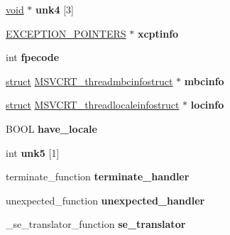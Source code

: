 \begin{DoxyCompactItemize}
\hyperlink{interfacevoid}{void} $\ast$ {\bfseries unk4} \mbox{[}3\mbox{]}
\item 
\mbox{\label{struct____thread__data_aa0656b2e59e51c7a38f3b96a54439ca4}} 
\hyperlink{struct___e_x_c_e_p_t_i_o_n___p_o_i_n_t_e_r_s}{E\+X\+C\+E\+P\+T\+I\+O\+N\+\_\+\+P\+O\+I\+N\+T\+E\+RS} $\ast$ {\bfseries xcptinfo}
\item 
\mbox{\label{struct____thread__data_a8f12bcb3dee8c16a51fb9549999bf540}} 
int {\bfseries fpecode}
\item 
\mbox{\label{struct____thread__data_a13926ec00320dff360cb92ecf3189a43}} 
\hyperlink{interfacestruct}{struct} \hyperlink{struct_m_s_v_c_r_t__threadmbcinfostruct}{M\+S\+V\+C\+R\+T\+\_\+threadmbcinfostruct} $\ast$ {\bfseries mbcinfo}
\item 
\mbox{\label{struct____thread__data_aaf63fd8e188ed1eb3405f21fc8a0e763}} 
\hyperlink{interfacestruct}{struct} \hyperlink{struct_m_s_v_c_r_t__threadlocaleinfostruct}{M\+S\+V\+C\+R\+T\+\_\+threadlocaleinfostruct} $\ast$ {\bfseries locinfo}
\item 
\mbox{\label{struct____thread__data_a459d879c00991ba65884b489a0722058}} 
B\+O\+OL {\bfseries have\+\_\+locale}
\item 
\mbox{\label{struct____thread__data_ae16761f08d8fb64426b1fbd8f80bb248}} 
int {\bfseries unk5} \mbox{[}1\mbox{]}
\item 
\mbox{\label{struct____thread__data_aae21a364527744e7a0c19e32edc2caa6}} 
terminate\+\_\+function {\bfseries terminate\+\_\+handler}
\item 
\mbox{\label{struct____thread__data_ac33056e36d609b80ae99a8a630ebabe7}} 
unexpected\+\_\+function {\bfseries unexpected\+\_\+handler}
\item 
\mbox{\label{struct____thread__data_a36703785fca1bd10426cd0748b0bd8cb}} 
\+\_\+se\+\_\+translator\+\_\+function {\bfseries se\+\_\+translator}
\item 
\mbox{\label{struct____thread__data_a6f6b462377a3aa95b84c97370f32b133}} 

\end{DoxyCompactItemize}
